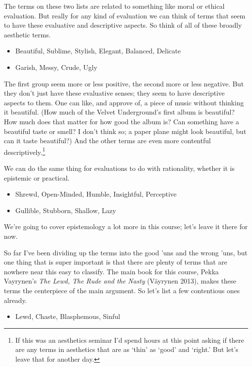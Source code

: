 \documentclass[
]{article}
\providecommand{\tightlist}{%
  \setlength{\itemsep}{0pt}\setlength{\parskip}{0pt}}
\begin{document}
The terms on these two lists are related to something like moral or
ethical evaluation. But really for any kind of evaluation we can think
of terms that seem to have these evaluative and descriptive aspects. So
think of all of these broadly aesthetic terms.

\begin{itemize}
\tightlist
\item
  Beautiful, Sublime, Stylish, Elegant, Balanced, Delicate
\item
  Garish, Messy, Crude, Ugly
\end{itemize}

The first group seem more or less positive, the second more or less
negative. But they don't just have these evaluative senses; they seem to
have descriptive aspects to them. One can like, and approve of, a piece
of music without thinking it beautiful. (How much of the Velvet
Underground's first album is beautiful? How much does that matter for
how good the album is? Can something have a beautiful taste or smell? I
don't think so; a paper plane might look beautiful, but can it taste
beautiful?) And the other terms are even more contentful
descriptively.\footnote{If this was an aesthetics seminar I'd spend
  hours at this point asking if there are any terms in aesthetics that
  are as `thin' as `good' and `right.' But let's leave that for another
  day.}

We can do the same thing for evaluations to do with rationality, whether
it is epistemic or practical.

\begin{itemize}
\tightlist
\item
  Shrewd, Open-Minded, Humble, Insightful, Perceptive
\item
  Gullible, Stubborn, Shallow, Lazy
\end{itemize}

We're going to cover epistemology a lot more in this course; let's leave
it there for now.

So far I've been dividing up the terms into the good 'uns and the wrong
'uns, but one thing that is super important is that there are plenty of
terms that are nowhere near this easy to classify. The main book for
this course, Pekka Vayrynen's \emph{The Lewd, The Rude and the Nasty}
(Väyrynen 2013), makes these terms the centerpiece of the main argument.
So let's list a few contentious ones already.

\begin{itemize}
\tightlist
\item
  Lewd, Chaste, Blasphemous, Sinful
\end{itemize}
\end{document}
